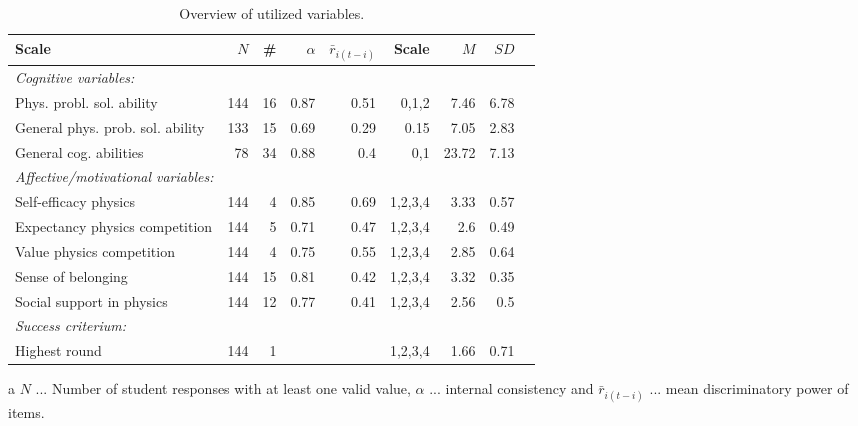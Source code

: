 \documentclass[D:/studies/WinnerS/Erhebungen/IPhO1718/paper/probsol_paper/main/TaylorFrancis/interactapasample]{subfiles}
\begin{document}
\begin{table}
\centering
\caption{Overview of utilized variables.}
\label{Tab1}
\begin{threeparttable}
\begin{tabular}{lrrrrrrrr}
\toprule
Scale & $N$ & \# & $\alpha$ & $\bar{r}_{i(t-i)}$ & Scale & $M$ & $SD$ \\ 
  \midrule
\textit{Cognitive variables:} &  &  &  &  &  &  &  \\ 
  Phys. probl. sol. ability & 144 & 16 & 0.87 & 0.51 & 0,1,2 & 7.46 & 6.78 \\ 
  General phys. prob. sol. ability & 133 & 15 & 0.69 & 0.29 & 0.15 & 7.05 & 2.83 \\ 
  General cog. abilities & 78 & 34 & 0.88 & 0.4 & 0,1 & 23.72 & 7.13 \\ 
  \midrule \textit{Affective/motivational variables:} &  &  &  &  &  &  &  \\ 
  Self-efficacy physics & 144 & 4 & 0.85 & 0.69 & 1,2,3,4 & 3.33 & 0.57 \\ 
  Expectancy physics competition & 144 & 5 & 0.71 & 0.47 & 1,2,3,4 & 2.6 & 0.49 \\ 
  Value physics competition & 144 & 4 & 0.75 & 0.55 & 1,2,3,4 & 2.85 & 0.64 \\ 
  Sense of belonging & 144 & 15 & 0.81 & 0.42 & 1,2,3,4 & 3.32 & 0.35 \\ 
  Social support in physics & 144 & 12 & 0.77 & 0.41 & 1,2,3,4 & 2.56 & 0.5 \\ 
  \midrule \textit{Success criterium:} &  &  &  &  &  &  &  \\ 
  Highest round & 144 & 1 &  &  & 1,2,3,4 & 1.66 & 0.71 \\ 
   \bottomrule\end{tabular}
\begin{tablenotes}
\item[a] $N$ ... Number of student responses with at least one valid value, $\alpha$ ... internal consistency and $\bar{r}_{i(t-i)}$ ... mean discriminatory power of items.
\end{tablenotes}
\end{threeparttable}
\end{table}
\end{document}
